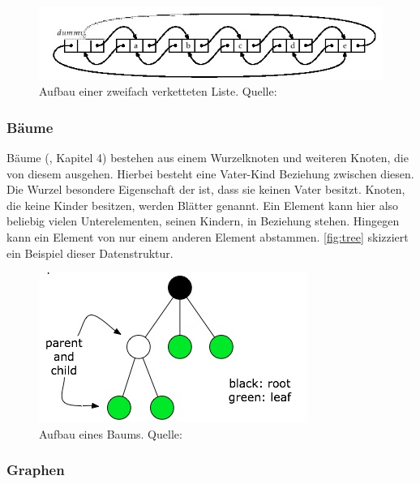 \documentclass[a4paper]{article}
\begin{document}
	\begin{figure}[H] 
		\includegraphics[width=\linewidth]{../Bilder/double_linked_list.jpg}
		\caption
		{
			Aufbau einer zweifach verketteten Liste.
			Quelle: \cite{DLList}
		}
		\label{fig:double_linked_list}
	\end{figure}	
	
	\subsubsection{Bäume}
		
	Bäume (\cite{FundData}, Kapitel 4) bestehen aus einem Wurzelknoten
	und weiteren Knoten, die von diesem ausgehen. Hierbei besteht eine Vater-Kind
	Beziehung zwischen diesen. Die Wurzel besondere Eigenschaft der ist, dass
	sie keinen Vater besitzt. Knoten, die keine Kinder besitzen, werden Blätter
	genannt. Ein Element kann hier also beliebig vielen Unterelementen, seinen
	Kindern, in Beziehung stehen. Hingegen kann ein Element von nur einem anderen
	Element abstammen. \autoref{fig:tree} skizziert ein Beispiel
	dieser Datenstruktur.
	
	\begin{figure}[H] 
		\centerline{
			\includegraphics{../Bilder/tree.jpg}
		}
		\caption
		{
			Aufbau eines Baums.
			Quelle: \cite{Trees}
		}
		\label{fig:tree}
	\end{figure}
	
	\subsubsection{Graphen}
	
\end{document}

